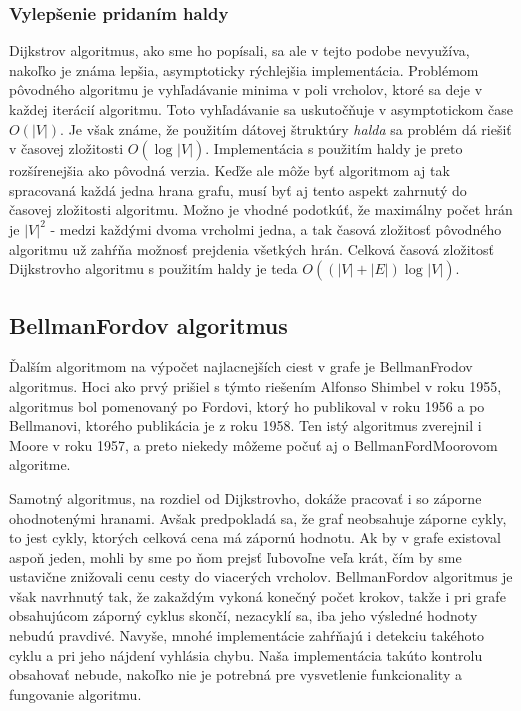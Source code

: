 \subsubsection{Vylepšenie pridaním haldy}

Dijkstrov algoritmus, ako sme ho popísali, sa ale v tejto podobe nevyužíva, nakoľko je známa lepšia, asymptoticky rýchlejšia implementácia. Problémom pôvodného algoritmu je vyhľadávanie minima v poli vrcholov, ktoré sa deje v každej iterácií algoritmu. Toto vyhľadávanie sa uskutočňuje v asymptotickom čase $O(|V|)$. Je však známe, že použitím dátovej štruktúry \textit{halda} sa problém dá riešiť v časovej zložitosti $O(\log_{}|V|)$. Implementácia s použitím haldy je preto rozšírenejšia ako pôvodná verzia. Keďže ale môže byť algoritmom aj tak spracovaná každá jedna hrana grafu, musí byť aj tento aspekt zahrnutý do časovej zložitosti algoritmu. Možno je vhodné podotkúť, že maximálny počet hrán je $|V|^{2}$ - medzi každými dvoma vrcholmi jedna, a tak časová zložitosť pôvodného algoritmu už zahŕňa možnosť prejdenia všetkých hrán. Celková časová zložitosť Dijkstrovho algoritmu s použitím haldy je teda $O((|V| + |E|)\log_{}|V|)$.\newline


\subsection{Bellman\textendash Fordov algoritmus}

Ďalším algoritmom na výpočet najlacnejších ciest v grafe je Bellman\textendash Frodov algoritmus. Hoci ako prvý prišiel s týmto riešením Alfonso Shimbel v roku 1955, algoritmus bol pomenovaný po Fordovi, ktorý ho publikoval v roku 1956 a po Bellmanovi, ktorého publikácia je z roku 1958. Ten istý algoritmus zverejnil i Moore v roku 1957, a preto niekedy môžeme počuť aj o Bellman\textendash Ford\textendash Moorovom algoritme.\newline

Samotný algoritmus, na rozdiel od Dijkstrovho, dokáže pracovať i so záporne ohodnotenými hranami. Avšak predpokladá sa, že graf neobsahuje záporne cykly, to jest cykly, ktorých celková cena má zápornú hodnotu. Ak by v grafe existoval aspoň jeden, mohli by sme po ňom prejsť ľubovoľne veľa krát, čím by sme ustavične znižovali cenu cesty do viacerých vrcholov. Bellman\textendash Fordov algoritmus je však navrhnutý tak, že zakaždým vykoná konečný počet krokov, takže i pri grafe obsahujúcom záporný cyklus skončí, nezacyklí sa, iba jeho výsledné hodnoty nebudú pravdivé. Navyše, mnohé implementácie zahŕňajú i detekciu takéhoto cyklu a pri jeho nájdení vyhlásia chybu. Naša implementácia takúto kontrolu obsahovať nebude, nakoľko nie je potrebná pre vysvetlenie funkcionality a fungovanie algoritmu.\newline


